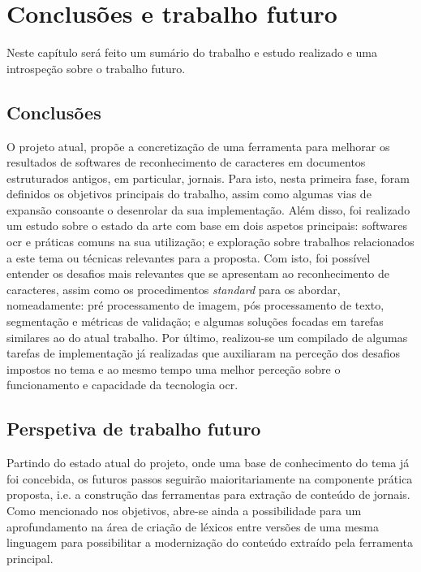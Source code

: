 \chapter{Conclusões e trabalho futuro}
\label{cap_conclusao}

Neste capítulo será feito um sumário do trabalho e estudo realizado e uma introspeção sobre o trabalho futuro.

\section{Conclusões}

O projeto atual, propõe a concretização de uma ferramenta para melhorar os resultados de softwares de reconhecimento de caracteres em documentos estruturados antigos, em particular, jornais. Para isto, nesta primeira fase, foram definidos os objetivos principais do trabalho, assim como algumas vias de expansão consoante o desenrolar da sua implementação. Além disso, foi realizado um estudo sobre o estado da arte com base em dois aspetos principais: softwares \acrshort{ocr} e práticas comuns na sua utilização; e exploração sobre trabalhos relacionados a este tema ou técnicas relevantes para a proposta. Com isto, foi possível entender os desafios mais relevantes que se apresentam ao reconhecimento de caracteres, assim como os procedimentos \textit{standard} para os abordar, nomeadamente: pré processamento de imagem, pós processamento de texto, segmentação e métricas de validação; e algumas soluções focadas em tarefas similares ao do atual trabalho. Por último, realizou-se um compilado de algumas tarefas de implementação já realizadas que auxiliaram na perceção dos desafios impostos no tema e ao mesmo tempo uma melhor perceção sobre o funcionamento e capacidade da tecnologia \acrshort{ocr}.

\section{Perspetiva de trabalho futuro}

Partindo do estado atual do projeto, onde uma base de conhecimento do tema já foi concebida, os futuros passos seguirão maioritariamente na componente prática proposta, i.e. a construção das ferramentas para extração de conteúdo de jornais. Como mencionado nos objetivos, abre-se ainda a possibilidade para um aprofundamento na área de criação de léxicos entre versões de uma mesma linguagem para possibilitar a modernização do conteúdo extraído pela ferramenta principal. 
		